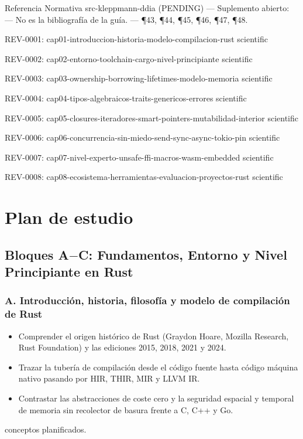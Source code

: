 \documentclass{book}
\begin{document}
\noindent Referencia Normativa src-kleppmann-ddia (PENDING) --- Suplemento abierto: --- No es la bibliografía de la guía. --- \P43, \P44, \P45, \P46, \P47, \P48.

\noindent REV-0001: cap01-introduccion-historia-modelo-compilacion-rust scientific

\noindent REV-0002: cap02-entorno-toolchain-cargo-nivel-principiante scientific

\noindent REV-0003: cap03-ownership-borrowing-lifetimes-modelo-memoria scientific

\noindent REV-0004: cap04-tipos-algebraicos-traits-genericos-errores scientific

\noindent REV-0005: cap05-closures-iteradores-smart-pointers-mutabilidad-interior scientific

\noindent REV-0006: cap06-concurrencia-sin-miedo-send-sync-async-tokio-pin scientific

\noindent REV-0007: cap07-nivel-experto-unsafe-ffi-macros-wasm-embedded scientific

\noindent REV-0008: cap08-ecosistema-herramientas-evaluacion-proyectos-rust scientific
\chapter{Plan de estudio}

\section*{Bloques A\(-\)C: Fundamentos, Entorno y Nivel Principiante en Rust}

\subsection*{\checkmark A. Introducción, historia, filosofía y modelo de compilación de Rust}
\begin{itemize}
\item Comprender el origen histórico de Rust (Graydon Hoare, Mozilla Research, Rust Foundation) y las ediciones 2015, 2018, 2021 y 2024.
\item Trazar la tubería de compilación desde el código fuente hasta código máquina nativo pasando por HIR, THIR, MIR y LLVM IR.
\item Contrastar las abstracciones de coste cero y la seguridad espacial y temporal de memoria sin recolector de basura frente a C, C++ y Go.
\end{itemize}
 conceptos planificados.
\end{document}
